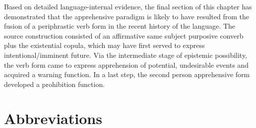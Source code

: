 \documentclass[output=paper,colorlinks,citecolor=brown,]{langscibook}
\begin{document}
Based on detailed language-internal evidence, the final section of this chapter has demonstrated that the apprehensive paradigm is likely to have resulted from the fusion of a periphrastic verb form in the recent history of the language. The source construction consisted of an affirmative same subject purposive converb plus the existential copula, which may have first served to express intentional\slash imminent future. Via the intermediate stage of epistemic possibility, the verb form came to express apprehension of potential, undesirable events and acquired a warning function. In a last step, the second person apprehensive form developed a prohibition function.

\section*{Abbreviations}
\end{document}
